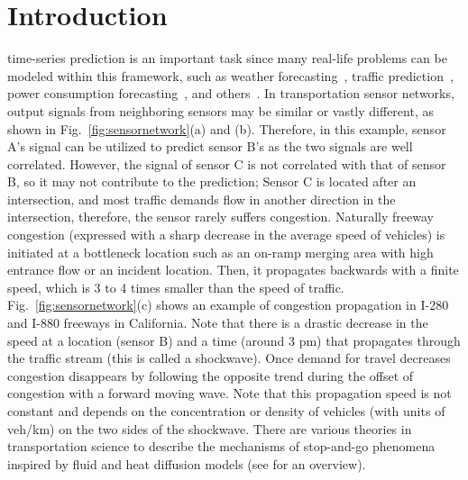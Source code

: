 \documentclass[journal]{IEEEtran}
\begin{document}
\section{Introduction}
 time-series prediction is an important task since many real-life problems can be modeled within this framework, such as weather forecasting~\cite{wan2019multivariate, das2017sembnet, ouyang2017combined}, traffic prediction~\cite{wang2019multiple, huang2019dsanet, chandra2009predictions,mai2012multivariate,kwak2020travel,cavalcante2017lasso, nicholson2020high, li2018diffusion, cui2019traffic, chen2019gated, zhang2019spatial, yu2018spatio, zhao2019t,  wu2019graph, wu2020connecting, xu2018graph}, power consumption forecasting~\cite{du2020multivariate, nicholson2020high}, and others~\cite{yao2018deep, wu2020connecting, huang2019dsanet, munkhdalai2019end, du2003univariate}.
In transportation sensor networks, output signals from neighboring sensors may be similar or vastly different, as shown in Fig.~\ref{fig:sensornetwork}(a) and (b). Therefore, in this example, sensor A's signal can be utilized to predict sensor B's as the two signals are well correlated. However, the signal of sensor C is not correlated with that of sensor B, so it may not contribute to the prediction; 
Sensor C is located after an intersection, and most traffic demands flow in another direction in the intersection, therefore, the sensor rarely suffers congestion.
Naturally freeway congestion (expressed with a sharp decrease in the average speed of vehicles) is initiated at a bottleneck location such as an on-ramp merging area with high entrance flow or an incident location. Then, it propagates backwards with a finite speed, which is 3 to 4 times smaller than the speed of traffic. Fig.~\ref{fig:sensornetwork}(c) shows an example of congestion propagation in I-280 and I-880 freeways in California. Note that there is a drastic decrease in the speed at a location (sensor B) and a time (around 3 pm) that propagates through the traffic stream (this is called a shockwave). Once demand for travel decreases congestion disappears by following the opposite trend during the offset of congestion with a forward moving wave. Note that this propagation speed is not constant and depends on the concentration or density of vehicles (with units of veh/km) on the two sides of the shockwave. There are various theories in transportation science to describe the mechanisms of stop-and-go phenomena inspired by fluid and heat diffusion models (see \cite{helbing2001traffic} for an overview). 
\end{document}
